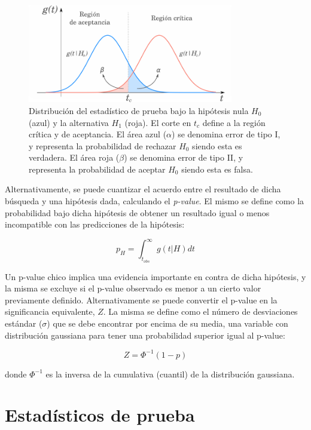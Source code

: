 \begin{figure}
  \centering
  \includegraphics[width=0.8\textwidth]{images/statistics/hypo_test.pdf}
  \caption{Distribución del estadístico de prueba bajo la hipótesis nula $H_0$ (azul) y la alternativa $H_1$ (roja). El corte en $t_c$ define a la región crítica y de aceptancia. El área azul ($\alpha$) se denomina error de tipo I, y representa la probabilidad de rechazar $H_0$ siendo esta es verdadera. El área roja ($\beta$) se denomina error de tipo II, y representa la probabilidad de aceptar $H_0$ siendo esta es falsa.}
  \label{fig:nullh}
\end{figure}


Alternativamente, se puede cuantizar el acuerdo entre el resultado de dicha búsqueda y una hipótesis dada, calculando el \textit{p-value}. El mismo se define como la probabilidad bajo dicha hipótesis de obtener un resultado igual o menos incompatible con las predicciones de la hipótesis:

\begin{equation}
	p_H = \int_{t_{obs}}^{\infty} g(t|H)dt
\end{equation}

Un p-value chico implica una evidencia importante en contra de dicha hipótesis, y la misma se excluye si el p-value observado es menor a un cierto valor previamente definido.  Alternativamente se puede convertir el p-value en la significancia equivalente, $Z$. La misma se define como el número de desviaciones estándar ($\sigma$) que se debe encontrar por encima de su media, una variable con distribución gaussiana para tener una probabilidad superior igual al p-value:

\begin{equation}
	Z=\Phi^{-1}(1-p)
	\label{ec:sign}
\end{equation}

\noindent
donde $\Phi^{-1}$ es la inversa de la cumulativa (cuantil) de la distribución gaussiana. 


\section{Estadísticos de prueba}

